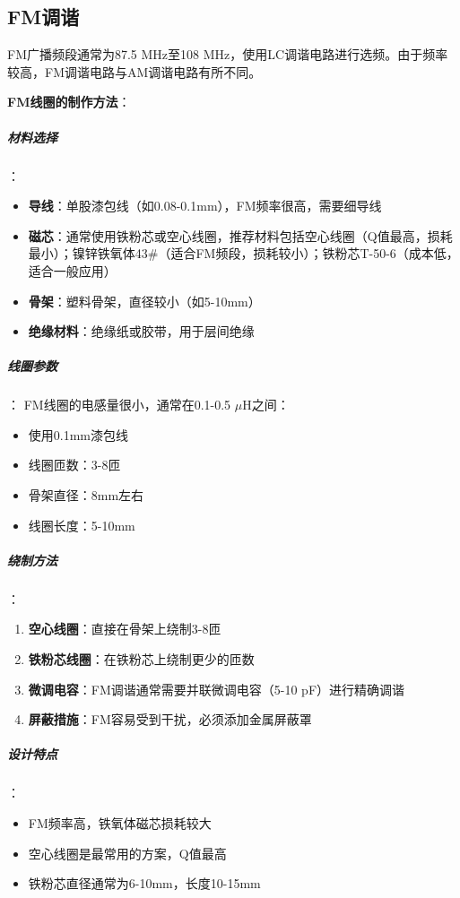 \subsection{FM调谐}
\label{sec:fm_tuning_application}

FM广播频段通常为87.5 MHz至108 MHz，使用LC调谐电路进行选频。由于频率较高，FM调谐电路与AM调谐电路有所不同。

\textbf{FM线圈的制作方法}：

\subparagraph{材料选择}：
\begin{itemize}
  \item \textbf{导线}：单股漆包线（如0.08-0.1mm），FM频率很高，需要细导线
  \item \textbf{磁芯}：通常使用铁粉芯或空心线圈，推荐材料包括空心线圈（Q值最高，损耗最小）；镍锌铁氧体43\#（适合FM频段，损耗较小）；铁粉芯T-50-6（成本低，适合一般应用）
  \item \textbf{骨架}：塑料骨架，直径较小（如5-10mm）
  \item \textbf{绝缘材料}：绝缘纸或胶带，用于层间绝缘
\end{itemize}

\subparagraph{线圈参数}：
FM线圈的电感量很小，通常在0.1-0.5 $\mu$H之间：
\begin{itemize}
    \item 使用0.1mm漆包线
    \item 线圈匝数：3-8匝
    \item 骨架直径：8mm左右
    \item 线圈长度：5-10mm
\end{itemize}

\subparagraph{绕制方法}：
\begin{enumerate}
    \item \textbf{空心线圈}：直接在骨架上绕制3-8匝
    \item \textbf{铁粉芯线圈}：在铁粉芯上绕制更少的匝数
    \item \textbf{微调电容}：FM调谐通常需要并联微调电容（5-10 pF）进行精确调谐
    \item \textbf{屏蔽措施}：FM容易受到干扰，必须添加金属屏蔽罩
\end{enumerate}

\subparagraph{设计特点}：
\begin{itemize}
    \item FM频率高，铁氧体磁芯损耗较大
    \item 空心线圈是最常用的方案，Q值最高
    \item 铁粉芯直径通常为6-10mm，长度10-15mm
\end{itemize}

